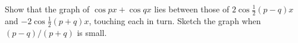 Show that the graph of $\cos px + \cos qx$  lies between those of
$2\cos\frac{1}{2}(p - q)x$ and $-2\cos\frac{1}{2}(p + q)x$, touching each in turn. Sketch the
graph when $(p - q)/(p + q)$ is small. 

